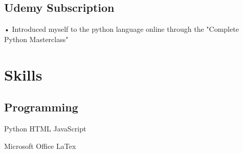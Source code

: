 \documentclass[letterpaper]{deedy-resume} %
\begin{document}
\begin{minipage}[t]{0.33\textwidth}
\subsection{Udemy Subscription}
•	Introduced myself to the python language online through the "Complete Python Masterclass"





\section{Skills}

\subsection{Programming}

Python \textbullet{} HTML 
\textbullet{} JavaScript 

 \textbullet{} Microsoft Office 
\textbullet{} LaTex 













\end{minipage}
\end{document}

